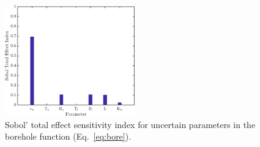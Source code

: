 \begin{figure}[p]
 \begin{center}
  \includegraphics[width=0.5\textwidth]{./Figures/sense_borehole}
\caption{Sobol' total effect sensitivity index for uncertain parameters in the borehole
function (Eq.~\ref{eq:bore}).}
\label{fig:sense_bore}
\end{center}
\end{figure}

\clearpage

